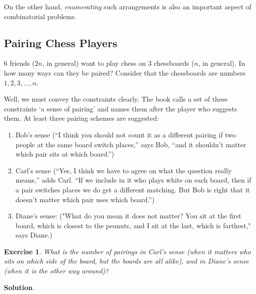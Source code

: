 \documentclass[11pt]{book}
\theoremstyle{definition}
\theoremstyle{plain}
\newtheorem{exercise}{Exercise}
\theoremstyle{definition}
\theoremstyle{problemstyle}
\theoremstyle{remark}
\theoremstyle{definition}
\begin{document}
On the other hand, \emph{enumerating} such arrangements is also an important aspect of combinatorial problems. 

\subsection*{Pairing Chess Players}
$6$ friends ($2n$, in general) want to play chess on $3$ chessboards ($n$, in general). In how many ways can they be paired? Consider that the chessboards are numbers $1,2,3,\dots,n$.

Well, we must convey the constraints clearly. The book calls a set of these constraints `a sense of pairing' and names them after the player who suggests them. At least three pairing schemes are suggested:
\begin{enumerate}
    \item Bob's sense (``I think you should not count it as a different pairing if two people at the same board switch places,'' says Bob, ``and it shouldn't matter which pair sits at which board.'')

    \item Carl's sense (``Yes, I think we have to agree on what the question really means,'' adds Carl. ``If we include in it who plays white on each board, then if a pair switches places we do get a different matching. But Bob is right that it doesn't matter which pair uses which board.'') 

    \item Diane's sense: ("What do you mean it does not matter? You sit at the first board, which is closest to the peanuts, and I sit at the last, which is farthest," says Diane.)
\end{enumerate}


\begin{exercise}
    What is the number of pairings in Carl's sense (when it matters who sits on which side of the board, but the boards are all alike), and in Diane's sense (when it is the other way around)?
    \label{ex:1.1.2}
\end{exercise}
\textbf{Solution}.
\end{document}
